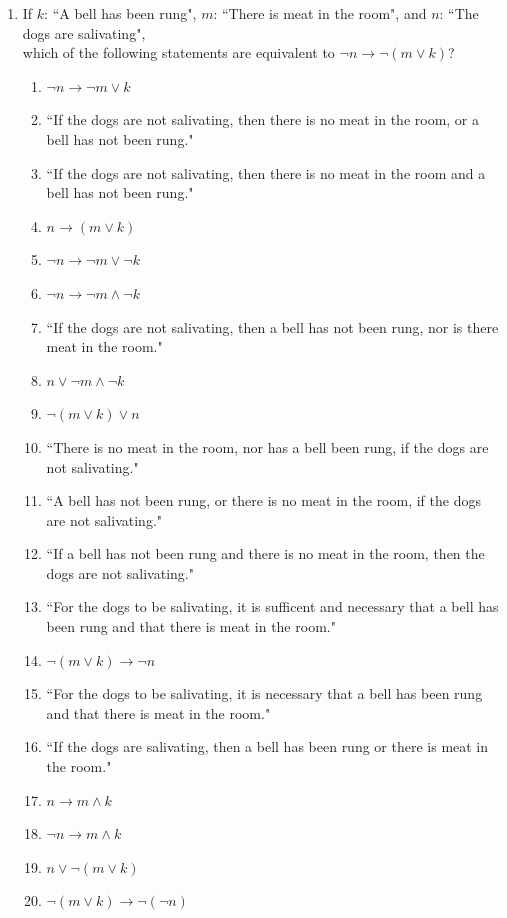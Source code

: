 \documentclass{article}
\begin{document}
\begin{enumerate}
\item If\marginpar{[3]} $k$: ``A bell has been rung", $m$: ``There is meat in the room", and $n$: ``The dogs are salivating",\\
which of the following statements are equivalent to $\neg n\to\neg(m\vee k)$?
	\renewcommand{\labelenumii}{\roman{enumii})}\begin{enumerate}
	\item $\neg n\to\neg m\vee k$
	\item ``If the dogs are not salivating, then there is no meat in the room, or a bell has not been rung."
	\item ``If the dogs are not salivating, then there is no meat in the room and a bell has not been rung."
	\item $n\to (m\vee k)$
	\item $\neg n\to \neg m\vee\neg k$
	\item $\neg n\to \neg m\wedge\neg k$
	\item ``If the dogs are not salivating, then a bell has not been rung, nor is there meat in the room."
	\item $n\vee\neg m\wedge\neg k$
	\item $\neg(m\vee k)\vee n$
	\item ``There is no meat in the room, nor has a bell been rung, if the dogs are not salivating."
	\item ``A bell has not been rung, or there is no meat in the room, if the dogs are not salivating."
	\item ``If a bell has not been rung and there is no meat in the room, then the dogs are not salivating."
	\item ``For the dogs to be salivating, it is sufficent and necessary that a bell has been rung and that there is meat in the room."
	\item $\neg (m\vee k)\to\neg n$
	\item ``For the dogs to be salivating, it is necessary that a bell has been rung and that there is meat in the room."
	\item ``If the dogs are salivating, then a bell has been rung or there is meat in the room."
	\item $n\to m\wedge k$
	\item $\neg n\to m\wedge k$
	\item $n\vee\neg(m\vee k)$
	\item $\neg(m\vee k)\to\neg(\neg n)$
	\end{enumerate}\pagebreak

\end{enumerate}
\end{document}
